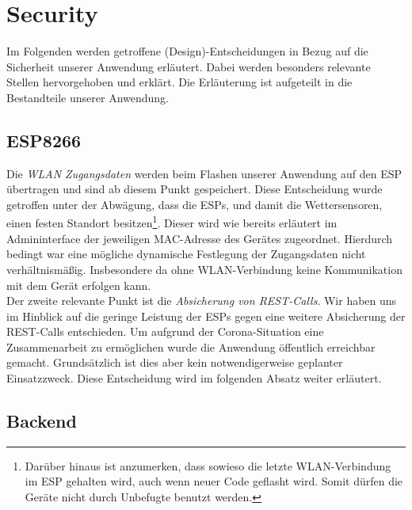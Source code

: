 

\section{Security}\label{Security}
Im Folgenden werden getroffene (Design)-Entscheidungen in Bezug auf die Sicherheit unserer Anwendung erläutert.
Dabei werden besonders relevante Stellen hervorgehoben und erklärt.
Die Erläuterung ist aufgeteilt in die Bestandteile unserer Anwendung.

\subsection{ESP8266}

Die \textit{WLAN Zugangsdaten} werden beim Flashen unserer Anwendung auf den ESP übertragen und sind ab diesem Punkt gespeichert.
Diese Entscheidung wurde getroffen unter der Abwägung, dass die ESPs, und damit die Wettersensoren, einen festen Standort besitzen\footnote{Darüber hinaus ist anzumerken, dass sowieso die letzte WLAN-Verbindung im ESP gehalten wird, auch wenn neuer Code geflasht wird. Somit dürfen die Geräte nicht durch Unbefugte benutzt werden.}.
Dieser wird wie bereits erläutert im Admininterface der jeweiligen MAC-Adresse des Gerätes zugeordnet.
Hierdurch bedingt war eine mögliche dynamische Festlegung der Zugangsdaten nicht verhältnismäßig.
Insbesondere da ohne WLAN-Verbindung keine Kommunikation mit dem Gerät erfolgen kann.\\
Der zweite relevante Punkt ist die \textit{Absicherung von REST-Calls}.
Wir haben uns im Hinblick auf die geringe Leistung der ESPs gegen eine weitere Absicherung der REST-Calls entschieden.
Um aufgrund der Corona-Situation eine Zusammenarbeit zu ermöglichen wurde die Anwendung öffentlich erreichbar gemacht.
Grundsätzlich ist dies aber kein notwendigerweise geplanter Einsatzzweck.
Diese Entscheidung wird im folgenden Absatz weiter erläutert.

\subsection{Backend}

